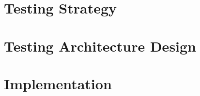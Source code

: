 
\section{Testing Strategy}
	
	\label{sec:5-strategy}
	
\section{Testing Architecture Design}
	
	\label{sec:5-architecture}
	
\section{Implementation}
	
	\label{sec:5-implementation}